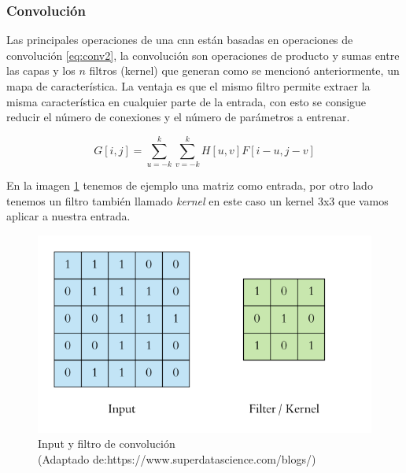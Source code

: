 \subsubsection{Convolución}\label{sub:convolucion}
Las principales operaciones de una \ac{cnn} están basadas en operaciones de convolución \ref{eq:conv2}, la convolución son operaciones de producto y sumas entre las capas y los $n $ filtros (kernel) que generan como se mencionó anteriormente, un mapa de característica. La ventaja es que el mismo filtro permite extraer la misma característica en cualquier parte de la entrada, con esto se consigue reducir el número de conexiones y el número de parámetros a entrenar.

\begin{equation}\label{eq:conv2}
    G[i, j] = \sum_{u=-k}^k \sum_{v=-k}^k H[u, v] F[i-u, j-v]
\end{equation} 





En la imagen \ref{Fig:filter} tenemos de ejemplo una matriz como entrada, por otro lado tenemos un filtro también llamado \textit{kernel} en este caso un kernel 3x3 que vamos aplicar a nuestra entrada.

\begin{figure}[H]
 \centering
  \includegraphics[scale=0.4,keepaspectratio=true,clip=true]{imagenes/MarcoTeorico/convoluc_1.png}
  \caption{Input y filtro de convolución \\ (Adaptado de:https://www.superdatascience.com/blogs/)}\label{Fig:filter}
\end{figure}

